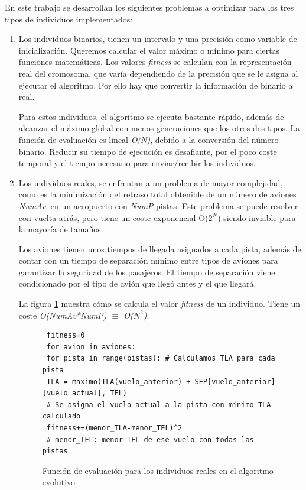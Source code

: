	
		En este trabajo se desarrollan los siguientes problemas a optimizar para los tres tipos de individuos implementados:
	
	\begin{enumerate}
		\item Los individuos binarios, tienen un intervalo y una precisión como variable de inicialización. Queremos calcular el valor máximo o mínimo para ciertas funciones matemáticas. Los valores \textit{fitness} se calculan con la representación real del cromosoma, que varía dependiendo de la precisión que se le asigna al ejecutar el algoritmo. Por ello hay que convertir la información de binario a real. 
		
		Para estos individuos, el algoritmo se ejecuta bastante rápido, además de alcanzar el máximo global con menos generaciones que los otros dos tipos. La función de evaluación es lineal \textit{O(N)}, debido a la conversión del número binario. Reducir su tiempo de ejecución es desafiante, por el poco coste temporal y el tiempo necesario para enviar/recibir los individuos.		
		
		\item Los individuos reales, se enfrentan a un problema de mayor complejidad, como es la minimización del retraso total obtenible de un número de aviones \textit{NumAv}, en un aeropuerto con \textit{NumP} pistas. Este problema se puede resolver con vuelta atrás, pero tiene un coste exponencial O(\(2^{N}\)) siendo inviable para la mayoría de tamaños. 
		
		Los aviones tienen unos tiempos de llegada asignados a cada pista, además de contar con un tiempo de separación mínimo entre tipos de aviones para garantizar la seguridad de los pasajeros. El tiempo de separación viene condicionado por el tipo de avión que llegó antes y el que llegará.		
			
		La figura \ref{fig:pev_funcion_ev_2} muestra cómo se calcula el valor \textit{fitness} de un individuo. Tiene un coste \textit{O(NumAv*NumP) $\equiv$ O(\(N^{2}\))}. 
		
		\begin{figure}[!h]
		
		
			\begin{lstlisting}
 fitness=0
 for avion in aviones:
 for pista in range(pistas): # Calculamos TLA para cada pista
 TLA = maximo(TLA(vuelo_anterior) + SEP[vuelo_anterior][vuelo_actual], TEL)
 # Se asigna el vuelo actual a la pista con minimo TLA calculado
 fitness+=(menor_TLA-menor_TEL)^2
 # menor_TEL: menor TEL de ese vuelo con todas las pistas		
			\end{lstlisting}
			\caption{Función de evaluación para los individuos reales en el algoritmo evolutivo}
			\label{fig:pev_funcion_ev_2}
		\end{figure}
		

\end{enumerate}
